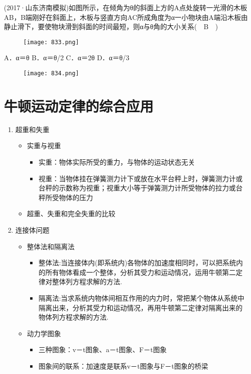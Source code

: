 \documentclass[cn,11pt]{elegantbook}
\begin{document}
\begin{example}
   (2017·山东济南模拟)如图所示，在倾角为θ的斜面上方的A点处旋转一光滑的木板AB，B端刚好在斜面上，木板与竖直方向AC所成角度为α一小物块由A端沿木板由静止滑下，要使物块滑到斜面的时间最短，则α与θ角的大小关系(　B　)
   
   \begin{figure}[htbp]
      \centering
      \texttt{[image: 833.png]}
   \end{figure}
   A．α＝θ	B．α＝θ/2
   C．α＝2θ	D．α＝θ/3
   
   \begin{solution}
      \begin{figure}[htbp]
         \centering
         \texttt{[image: 834.png]}
      \end{figure}
         
   \end{solution}
\end{example}



\chapter{牛顿运动定律的综合应用}
\begin{enumerate}
   \item 超重和失重
   \begin{itemize}
      \item 实重与视重
      \begin{itemize}
         \item 实重：物体实际所受的重力，与物体的运动状态无关
         \item 视重：当物体挂在弹簧测力计下或放在水平台秤上时，弹簧测力计或台秤的示数称为视重；视重大小等于弹簧测力计所受物体的拉力或台秤所受物体的压力
      \end{itemize}
      \item 超重、失重和完全失重的比较
      
   \end{itemize}
   \item 连接体问题
   \begin{itemize}
      \item 整体法和隔离法
      \begin{itemize}
         \item 整体法:当连接体内(即系统内)各物体的加速度相同时，可以把系统内的所有物体看成一个整体，分析其受力和运动情况，运用牛顿第二定律对整体列方程求解的方法.
         \item 隔离法:当求系统内物体间相互作用的内力时，常把某个物体从系统中隔离出来，分析其受力和运动情况，再用牛顿第二定律对隔离出来的物体列方程求解的方法.
      \end{itemize}
      \item 动力学图象
      \begin{itemize}
         \item 三种图象：v－t图象、a－t图象、F－t图象
         \item 图象间的联系：加速度是联系v－t图象与F－t图象的桥梁
      \end{itemize}
   \end{itemize}
\end{enumerate}
\end{document}
